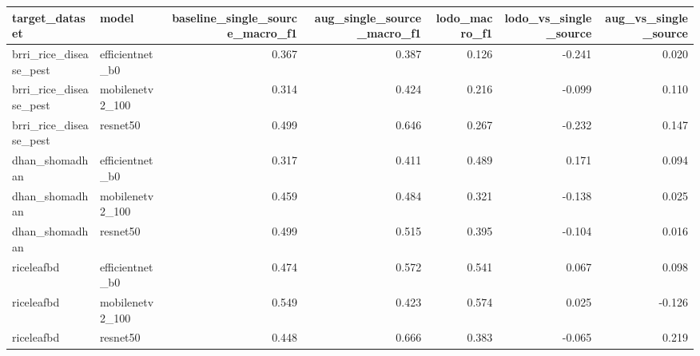 \begin{tabular}{llrrrrr}
\toprule
target_dataset & model & baseline_single_source_macro_f1 & aug_single_source_macro_f1 & lodo_macro_f1 & lodo_vs_single_source & aug_vs_single_source \\
\midrule
brri_rice_disease_pest & efficientnet_b0 & 0.367 & 0.387 & 0.126 & -0.241 & 0.020 \\
brri_rice_disease_pest & mobilenetv2_100 & 0.314 & 0.424 & 0.216 & -0.099 & 0.110 \\
brri_rice_disease_pest & resnet50 & 0.499 & 0.646 & 0.267 & -0.232 & 0.147 \\
dhan_shomadhan & efficientnet_b0 & 0.317 & 0.411 & 0.489 & 0.171 & 0.094 \\
dhan_shomadhan & mobilenetv2_100 & 0.459 & 0.484 & 0.321 & -0.138 & 0.025 \\
dhan_shomadhan & resnet50 & 0.499 & 0.515 & 0.395 & -0.104 & 0.016 \\
riceleafbd & efficientnet_b0 & 0.474 & 0.572 & 0.541 & 0.067 & 0.098 \\
riceleafbd & mobilenetv2_100 & 0.549 & 0.423 & 0.574 & 0.025 & -0.126 \\
riceleafbd & resnet50 & 0.448 & 0.666 & 0.383 & -0.065 & 0.219 \\
\bottomrule
\end{tabular}
